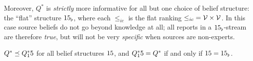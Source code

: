 Moreover, $Q^*$ is \emph{strictly} more informative for all but one choice of
belief structure: the ``flat'' structure $15_\flat$, where each $\le_{ic}$ is
the flat ranking ${\le_{ic}} = \mathcal{V} \times \mathcal{V}$. In this case source beliefs
do not go beyond knowledge at all; all reports in a $15_\flat$-stream are
therefore \emph{true}, but will not be very \emph{specific} when sources are
non-experts.

\begin{proposition}
    \label{tt_prop_qstar_refines_qstarb}
    $Q^* \preceq Q^*_15$ for all belief structures $15$, and $Q^*_15 =
    Q^*$ if and only if $15 = 15_\flat$.\footnotemark{}
\end{proposition}


